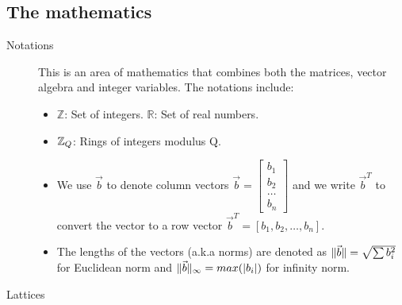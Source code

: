 \subsection{The mathematics}
\label{ssub:The mathematics}
\begin{description}
    \item[Notations]
        This is an area of mathematics that combines both the matrices, vector algebra
        and integer variables. The notations include:
        \begin{itemize}
            \item $\mathbb{Z}$: Set of integers. $\mathbb{R}$: Set of real numbers.
            \item $\mathbb{Z}_Q{}$: Rings of integers modulus Q.
            \item We use $\vec{b}$ to denote column vectors $\vec{b} = \begin{bmatrix}
                    b_1\\b_2\\\dots\\b_n
                \end{bmatrix}$ and we write $\vec{b}^T$ to convert the vector to a row
                vector $\vec{b}^T = [b_1, b_2, \dots, b_n]$.
            \item The lengths of the vectors (a.k.a norms) are denoted as
                $\Vert \vec{b} \Vert = \sqrt{\sum{b_i^2}}$ for
                Euclidean norm and $\Vert \vec{b} \Vert_{\infty} = max(|b_i|)$ for infinity norm.
        \end{itemize}
    \item[Lattices]
\end{description}
